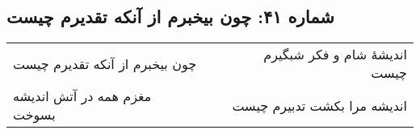 \begin{center}
\section*{شماره ۴۱: چون بیخبرم از آنکه تقدیرم چیست}
\label{sec:041}
\begin{longtable}{l p{0.5cm} r}
چون بیخبرم از آنکه تقدیرم چیست
&&
اندیشهٔ شام و فکر شبگیرم چیست
\\
مغزم همه در آتش اندیشه بسوخت
&&
اندیشه مرا بکشت تدبیرم چیست
\\
\end{longtable}
\end{center}
